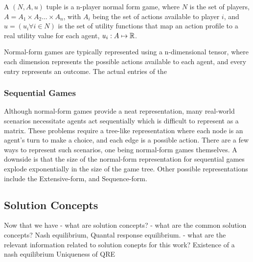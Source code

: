 \begin{definition}

	A $(N, A, u)$ tuple
	is a n-player normal form game, where $N$ is the set of players, $A = A_1 \times A_2 \ldots \times
		A_n$, with $A_i$ being the set of actions available to player $i$, and $u = (u_i \forall i \in N)$
	is the set of utility functions that map an action profile to a real utility value for each agent,
	$u_i: A \mapsto \mathbb{R}$.

\end{definition}

Normal-form games are typically represented using a n-dimensional tensor, where each dimension
represents the possible actions available to each agent, and every entry represents an outcome.
The actual entries of the

\subsubsection*{Sequential Games}

Although normal-form games provide a neat representation, many real-world scenarios necessitate
agents act sequentially which is difficult to represent as a matrix.
These problems require a tree-like representation where each node is an agent's turn to make a
choice, and each edge is a possible action.
There are a few ways to represent such scenarios, one being normal-form games themselves.
A downside is that the size of the normal-form representation for sequential games explode
exponentially in the size of the game tree.
Other possible representations include the Extensive-form, and Sequence-form.

\begin{definition}
\end{definition}

\begin{definition}
\end{definition}

\subsection{Solution Concepts}

Now that we have - what are solution concepts?
- what are the common solution concepts?
Nash equilibrium, Quantal response equilibrium.
- what are the relevant information related to solution conepts for this work?
Existence of a nash equilibrium Uniqueness of QRE

